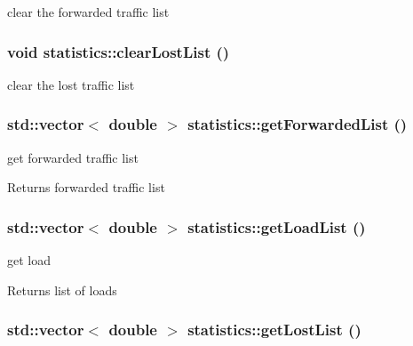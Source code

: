 clear the forwarded traffic list 

\hypertarget{classstatistics_a897546605e8b6c2b2ec411092e89dab8}{
\subsubsection[{clearLostList}]{\setlength{\rightskip}{0pt plus 5cm}void statistics::clearLostList ()}}
\label{classstatistics_a897546605e8b6c2b2ec411092e89dab8}


clear the lost traffic list 

\hypertarget{classstatistics_ab2c51b1a4cc826a09473860faf565360}{
\subsubsection[{getForwardedList}]{\setlength{\rightskip}{0pt plus 5cm}std::vector$<$ double $>$ statistics::getForwardedList ()}}
\label{classstatistics_ab2c51b1a4cc826a09473860faf565360}


get forwarded traffic list 

\begin{DoxyReturn}{Returns}
forwarded traffic list 
\end{DoxyReturn}
\hypertarget{classstatistics_a170d529ea5d3c459755309e2de1d166e}{
\subsubsection[{getLoadList}]{\setlength{\rightskip}{0pt plus 5cm}std::vector$<$ double $>$ statistics::getLoadList ()}}
\label{classstatistics_a170d529ea5d3c459755309e2de1d166e}


get load 

\begin{DoxyReturn}{Returns}
list of loads 
\end{DoxyReturn}
\hypertarget{classstatistics_a99795974e97556668c02c5005b2df895}{
\subsubsection[{getLostList}]{\setlength{\rightskip}{0pt plus 5cm}std::vector$<$ double $>$ statistics::getLostList ()}}
\label{classstatistics_a99795974e97556668c02c5005b2df895}


